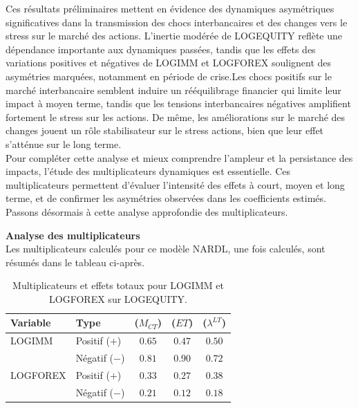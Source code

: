 Ces résultats préliminaires mettent en évidence des dynamiques asymétriques significatives dans la transmission des chocs interbancaires et des changes vers le stress sur le marché des actions. L'inertie modérée de LOGEQUITY reflète une dépendance importante aux dynamiques passées, tandis que les effets des variations positives et négatives de LOGIMM et LOGFOREX soulignent des asymétries marquées, notamment en période de crise.Les chocs positifs sur le marché interbancaire semblent induire un rééquilibrage financier qui limite leur impact à moyen terme, tandis que les tensions interbancaires négatives amplifient fortement le stress sur les actions. De même, les améliorations sur le marché des changes jouent un rôle stabilisateur sur le stress actions, bien que leur effet s’atténue sur le long terme.\\

Pour compléter cette analyse et mieux comprendre l'ampleur et la persistance des impacts, l'étude des multiplicateurs dynamiques est essentielle. Ces multiplicateurs permettent d’évaluer l’intensité des effets à court, moyen et long terme, et de confirmer les asymétries observées dans les coefficients estimés. Passons désormais à cette analyse approfondie des multiplicateurs.

\vspace{0.5cm}

\textbf{Analyse des multiplicateurs} \\

Les multiplicateurs calculés pour ce modèle NARDL, une fois calculés, sont résumés dans le tableau ci-après.

\begin{table}[H]
\centering
\sffamily
\caption{Multiplicateurs et effets totaux pour LOGIMM et LOGFOREX sur LOGEQUITY.}
\label{tab:multiplicateurs_logequity}
\begin{tabular}{llccc}
\toprule
\textbf{Variable}   & \textbf{Type}          & \textbf{(\(M_{CT}\))} & \textbf{(\(ET\))} & \textbf{(\(\lambda^{LT}\))} \\ \midrule
{LOGIMM} & Positif (\(+\))    & \( 0.65 \)           & \( 0.47 \)           & \( 0.50 \)        \\ 
         & Négatif (\(-\))    & \( 0.81 \)           & \( 0.90 \)           & \( 0.72 \)        \\ \midrule
{LOGFOREX} & Positif (\(+\))   & \( 0.33 \)           & \( 0.27 \)           & \( 0.38 \)        \\  
           & Négatif (\(-\))   & \( 0.21 \)           & \( 0.12 \)           & \( 0.18 \)        \\ \bottomrule
\end{tabular}
\end{table}

